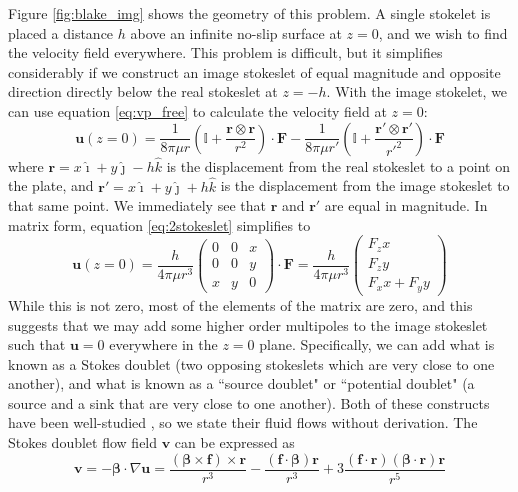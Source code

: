 \documentclass[11pt]{ucthesis}
\begin{document}
Figure \ref{fig:blake_img} shows the geometry of this problem. A single stokelet is placed a distance $h$ above an infinite no-slip surface at $z=0$, and we wish to find the velocity field everywhere. This problem is difficult, but it simplifies considerably if we construct an image stokeslet of equal magnitude and opposite direction directly below the real stokeslet at $z=-h$. With the image stokelet, we can use equation \ref{eq:vp_free} to calculate the velocity field at $z=0$:
\begin{equation}
\label{eq:2stokeslet}
\mathbf{u}(z = 0) = \frac{1}{8\pi \mu r }\left(\mathbb{I} + \frac{\mathbf{r\otimes r}}{r^2}\right)\cdot\mathbf{F} - \frac{1}{8\pi \mu r' }\left(\mathbb{I} + \frac{\mathbf{r'\otimes r'}}{r'^2}\right)\cdot\mathbf{F}
\end{equation} 
where $\mathbf{r} = x\hat\imath + y\hat\jmath - h\hat k$ is the displacement from the real stokeslet to a point on the plate, and $\mathbf{r'}= x\hat\imath + y\hat\jmath + h\hat k$ is the displacement from the image stokeslet to that same point. We immediately see that $\mathbf{r}$ and $\mathbf{r'}$ are equal in magnitude. In matrix form, equation \ref{eq:2stokeslet} simplifies to
\begin{equation}
\label{eq:stokeslets_mtx}
\mathbf{u}(z = 0) = \frac{h}{4\pi\mu r^3}\left(\begin{array}{ccc}
0&0&x\\
0&0&y\\
x&y&0
\end{array}\right)\cdot\mathbf{F} = \frac{h}{4\pi\mu r^3}\left(\begin{array}{c}
F_z x\\
F_z y\\
F_x x + F_y y
\end{array}\right)
\end{equation}
While this is not zero, most of the elements of the matrix are zero, and this suggests that we may add some higher order multipoles to the image stokeslet such that $\mathbf{u} = 0$ everywhere in the $z=0$ plane. Specifically, we can add what is known as a Stokes doublet (two opposing stokeslets which are very close to one another), and what is known as a ``source doublet" or ``potential doublet" (a source and a sink that are very close to one another). Both of these constructs have been well-studied \cite{chwang1975hydromechanics}, so we state their fluid flows without derivation. The Stokes doublet flow field $\mathbf{v}$ can be expressed as
\begin{equation}
\label{eq:stokes_doublet}
\mathbf{v} = -\boldsymbol{\beta}\cdot\nabla\mathbf{u} = \frac{(\boldsymbol{\beta}\times\mathbf{f})\times\mathbf{r}}{r^3} - \frac{(\mathbf{f}\cdot \boldsymbol{\beta})\mathbf{r}}{r^3} + 3\frac{(\mathbf{f}\cdot\mathbf{r})(\boldsymbol{\beta}\cdot\mathbf{r})\mathbf{r}}{r^5} 
\end{equation}
\end{document}
